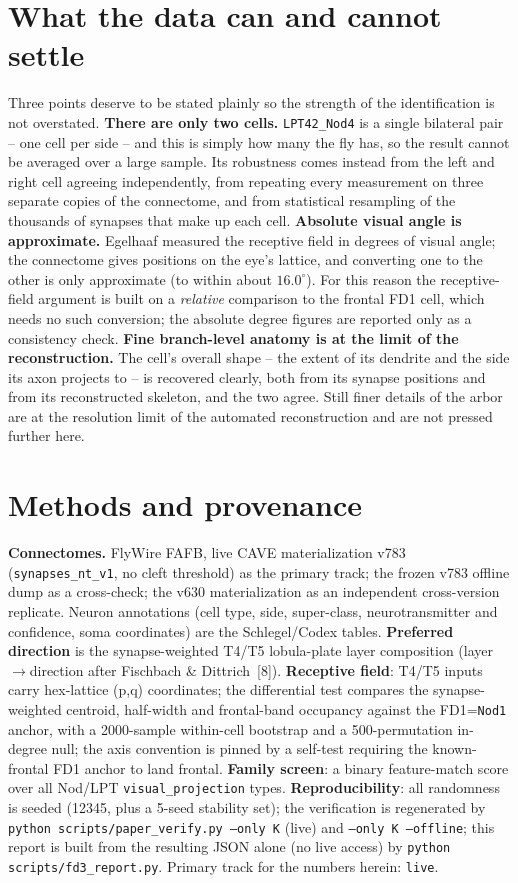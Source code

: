 \documentclass[11pt]{article}
\newcommand{\ttt}[1]{\texttt{#1}}
\begin{document}
\section{What the data can and cannot settle}

Three points deserve to be stated plainly so the strength of the identification is not overstated. \textbf{There are only two cells.} \ttt{LPT42\_Nod4} is a single bilateral pair -- one cell per side -- and this is simply how many the fly has, so the result cannot be averaged over a large sample. Its robustness comes instead from the left and right cell agreeing independently, from repeating every measurement on three separate copies of the connectome, and from statistical resampling of the thousands of synapses that make up each cell. \textbf{Absolute visual angle is approximate.} Egelhaaf measured the receptive field in degrees of visual angle; the connectome gives positions on the eye's lattice, and converting one to the other is only approximate (to within about $16.0^\circ$). For this reason the receptive-field argument is built on a \emph{relative} comparison to the frontal FD1 cell, which needs no such conversion; the absolute degree figures are reported only as a consistency check. \textbf{Fine branch-level anatomy is at the limit of the reconstruction.} The cell's overall shape -- the extent of its dendrite and the side its axon projects to -- is recovered clearly, both from its synapse positions and from its reconstructed skeleton, and the two agree. Still finer details of the arbor are at the resolution limit of the automated reconstruction and are not pressed further here.

\section{Methods and provenance}

\textbf{Connectomes.} FlyWire FAFB, live CAVE materialization v783 (\ttt{synapses\_nt\_v1}, no cleft threshold) as the primary track; the frozen v783 offline dump as a cross-check; the v630 materialization as an independent cross-version replicate. Neuron annotations (cell type, side, super-class, neurotransmitter and confidence, soma coordinates) are the Schlegel/Codex tables. \textbf{Preferred direction} is the synapse-weighted T4/T5 lobula-plate layer composition (layer$\to$direction after Fischbach \& Dittrich~[8]). \textbf{Receptive field}: T4/T5 inputs carry hex-lattice (p,q) coordinates; the differential test compares the synapse-weighted centroid, half-width and frontal-band occupancy against the FD1=\ttt{Nod1} anchor, with a 2000-sample within-cell bootstrap and a 500-permutation in-degree null; the axis convention is pinned by a self-test requiring the known-frontal FD1 anchor to land frontal. \textbf{Family screen}: a binary feature-match score over all Nod/LPT \ttt{visual\_projection} types. \textbf{Reproducibility}: all randomness is seeded (12345, plus a 5-seed stability set); the verification is regenerated by \ttt{python scripts/paper\_verify.py --only K} (live) and \ttt{--only K --offline}; this report is built from the resulting JSON alone (no live access) by \ttt{python scripts/fd3\_report.py}. Primary track for the numbers herein: \ttt{live}.
\end{document}
